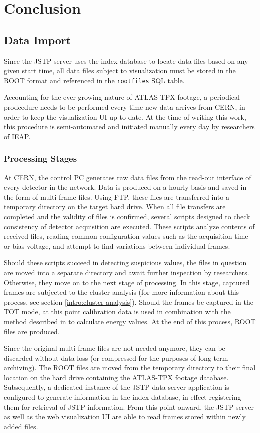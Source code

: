 \chapter{Conclusion}

\section{Data Import}
Since the JSTP server uses the index database to locate data files based on any given start time, all data files subject to visualization must be stored in the ROOT format and referenced in the \texttt{rootfiles} SQL table.

Accounting for the ever-growing nature of ATLAS-TPX footage, a periodical prodcedure needs to be performed every time new data arrives from CERN, in order to keep the visualization UI up-to-date. At the time of writing this work, this procedure is semi-automated and initiated manually every day by researchers of IEAP.

\subsection{Processing Stages}
At CERN, the control PC generates raw data files from the read-out interface of every detector in the network. Data is produced on a hourly basis and saved in the form of multi-frame files. Using FTP, these files are transferred into a temporary directory on the target hard drive. When all file transfers are completed and the validity of files is confirmed, several scripts designed to check consistency of detector acquisition are executed. These scripts analyze contents of received files, reading common configuration values such as the acquisition time or bias voltage, and attempt to find variations between individual frames.

Should these scripts succeed in detecting suspicious values, the files in question are moved into a separate directory and await further inspection by researchers. Otherwise, they move on to the next stage of processing. In this stage, captured frames are subjected to the cluster analysis (for more information about this process, see section \ref{intro:cluster-analysis}). Should the frames be captured in the TOT mode, at this point calibration data is used in combination with the method described in \cite{Jakubek2011S262} to calculate energy values. At the end of this process, ROOT files are produced.

Since the original multi-frame files are not needed anymore, they can be discarded without data loss (or compressed for the purposes of long-term archiving). The ROOT files are moved from the temporary directory to their final location on the hard drive containing the ATLAS-TPX footage database. Subsequently, a dedicated instance of the JSTP data server application is configured to generate information in the index database, in effect registering them for retrieval of JSTP information. From this point onward, the JSTP server as well as the web visualization UI are able to read frames stored within newly added files.

